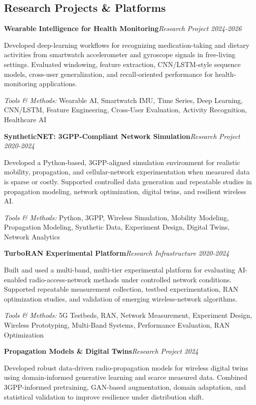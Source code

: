 \documentclass[9pt,letterpaper]{extarticle}
\newcommand{\entry}[2]{\Needspace{4\baselineskip}\textbf{#1}\hfill\textit{#2}\par}
\begin{document}
\subsection{Research Projects \& Platforms}
\entry{Wearable Intelligence for Health Monitoring}{Research Project \textbar{} 2024-2026}
Developed deep-learning workflows for recognizing medication-taking and dietary activities from smartwatch accelerometer and gyroscope signals in free-living settings. Evaluated windowing, feature extraction, CNN/LSTM-style sequence models, cross-user generalization, and recall-oriented performance for health-monitoring applications.\par
{\small\textit{Tools \& Methods:} Wearable AI, Smartwatch IMU, Time Series, Deep Learning, CNN/LSTM, Feature Engineering, Cross-User Evaluation, Activity Recognition, Healthcare AI\par}
\vspace{1pt}
\entry{SyntheticNET: 3GPP-Compliant Network Simulation}{Research Project \textbar{} 2020-2024}
Developed a Python-based, 3GPP-aligned simulation environment for realistic mobility, propagation, and cellular-network experimentation when measured data is sparse or costly. Supported controlled data generation and repeatable studies in propagation modeling, network optimization, digital twins, and resilient wireless AI.\par
{\small\textit{Tools \& Methods:} Python, 3GPP, Wireless Simulation, Mobility Modeling, Propagation Modeling, Synthetic Data, Experiment Design, Digital Twins, Network Analytics\par}
\vspace{1pt}
\entry{TurboRAN Experimental Platform}{Research Infrastructure \textbar{} 2020-2024}
Built and used a multi-band, multi-tier experimental platform for evaluating AI-enabled radio-access-network methods under controlled network conditions. Supported repeatable measurement collection, testbed experimentation, RAN optimization studies, and validation of emerging wireless-network algorithms.\par
{\small\textit{Tools \& Methods:} 5G Testbeds, RAN, Network Measurement, Experiment Design, Wireless Prototyping, Multi-Band Systems, Performance Evaluation, RAN Optimization\par}
\vspace{1pt}
\entry{Propagation Models \& Digital Twins}{Research Project \textbar{} 2024}
Developed robust data-driven radio-propagation models for wireless digital twins using domain-informed generative learning and scarce measured data. Combined 3GPP-informed pretraining, GAN-based augmentation, domain adaptation, and statistical validation to improve resilience under distribution shift.\par
\end{document}
